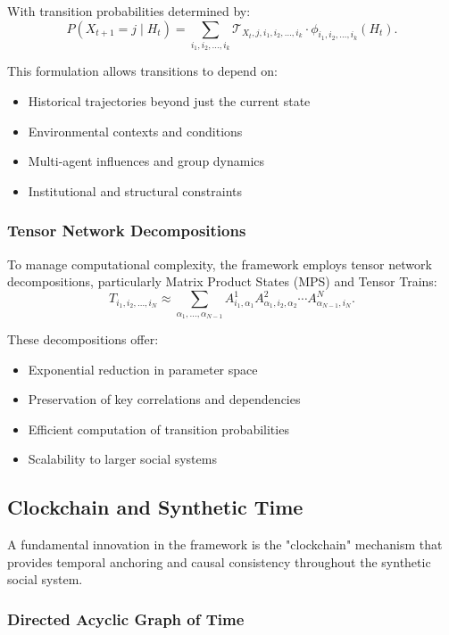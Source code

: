 \documentclass[11pt,a4paper]{article}
\begin{document}
With transition probabilities determined by:
\begin{equation}
P(X_{t+1} = j \mid H_t) = \sum_{i_1,i_2,\ldots,i_k} \mathcal{T}_{X_t,j,i_1,i_2,\ldots,i_k} \cdot \phi_{i_1,i_2,\ldots,i_k}(H_t).
\end{equation}

This formulation allows transitions to depend on:
\begin{itemize}
\item Historical trajectories beyond just the current state
\item Environmental contexts and conditions
\item Multi-agent influences and group dynamics
\item Institutional and structural constraints
\end{itemize}

\subsubsection{Tensor Network Decompositions}

To manage computational complexity, the framework employs tensor network decompositions, particularly Matrix Product States (MPS) and Tensor Trains:
\begin{equation}
T_{i_1,i_2,\ldots,i_N} \approx \sum_{\alpha_1,\ldots,\alpha_{N-1}} A^1_{i_1,\alpha_1} A^2_{\alpha_1,i_2,\alpha_2} \cdots A^N_{\alpha_{N-1},i_N}.
\end{equation}

These decompositions offer:
\begin{itemize}
\item Exponential reduction in parameter space
\item Preservation of key correlations and dependencies
\item Efficient computation of transition probabilities
\item Scalability to larger social systems
\end{itemize}

\subsection{Clockchain and Synthetic Time}

A fundamental innovation in the framework is the "clockchain" mechanism that provides temporal anchoring and causal consistency throughout the synthetic social system.

\subsubsection{Directed Acyclic Graph of Time}
\end{document}
